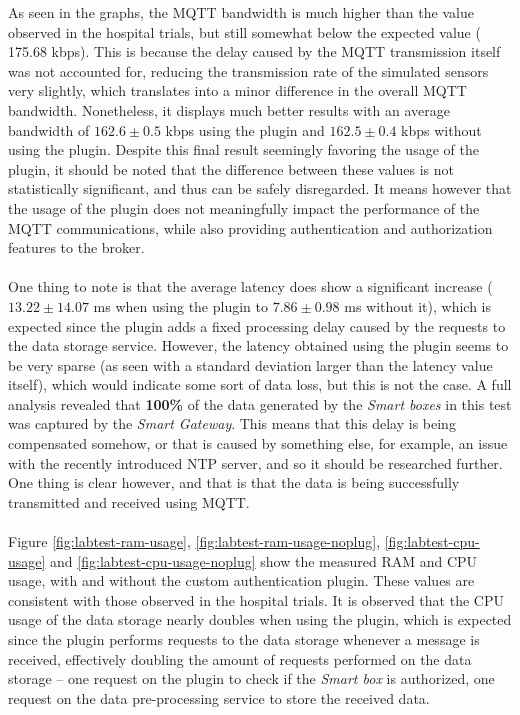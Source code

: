 As seen in the graphs, the \acs{MQTT} bandwidth is much higher than the value observed in the hospital trials, but still somewhat below the expected value ({\color{blue} 175.68} kbps). 
This is because the delay caused by the \acs{MQTT} transmission itself was not accounted for, reducing the transmission rate of the simulated sensors very slightly, which translates into a minor difference in the overall \acs{MQTT} bandwidth. Nonetheless, it displays much better results with an average bandwidth of {\color{blue}$162.6 \pm 0.5$} kbps using the plugin and {\color{blue}$162.5 \pm 0.4$} kbps without using the plugin. Despite this final result seemingly favoring the usage of the plugin, it should be noted that the difference between these values is not statistically significant, and thus can be safely disregarded. It means however that the usage of the plugin does not meaningfully impact the performance of the \acs{MQTT} communications, while also providing authentication and authorization features to the broker.

\paragraph{} One thing to note is that the average latency does show a significant increase ($13.22 \pm 14.07$ ms when using the plugin to $7.86 \pm 0.98$ ms without it), which is expected since the plugin adds a fixed processing delay caused by the requests to the data storage service. However, the latency obtained using the plugin seems to be very sparse (as seen with a standard deviation larger than the latency value itself), which would indicate some sort of data loss, but this is not the case. A full analysis revealed that \textbf{100\%} of the data generated by the \textit{Smart boxes} in this test was captured by the \textit{Smart Gateway}. This means that this delay is being compensated somehow, or that is caused by something else, for example, an issue with the recently introduced \acs{NTP} server, and so it should be researched further. One thing is clear however, and that is that the data is being successfully transmitted and received using \acs{MQTT}. 

\paragraph{} Figure \ref{fig:labtest-ram-usage}, \ref{fig:labtest-ram-usage-noplug}, \ref{fig:labtest-cpu-usage} and \ref{fig:labtest-cpu-usage-noplug} show the measured \acs{RAM} and \acs{CPU} usage, with and without the custom authentication plugin. These values are consistent with those observed in the hospital trials. It is observed that the \acs{CPU} usage of the data storage nearly doubles when using the plugin, which is expected since the plugin performs requests to the data storage whenever a message is received, effectively doubling the amount of requests performed on the data storage -- one request on the plugin to check if the \textit{Smart box} is authorized, one request on the data pre-processing service to store the received data.

